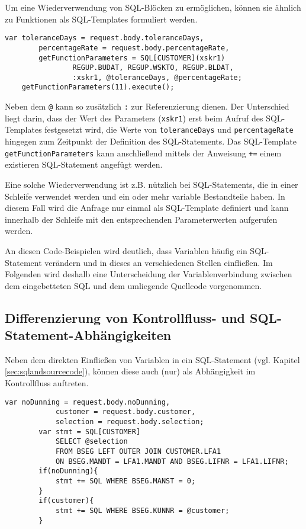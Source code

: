 Um eine Wiederverwendung von SQL-Blöcken zu ermöglichen, können sie ähnlich zu Funktionen als SQL-Templates \cite{Horschig2014} formuliert werden.

	\begin{lstlisting}[caption={SQL-Templates ermöglichen Wiederverwendung}, label={lst:sqlfunctions}, language=JavaScriptSQL]
	var toleranceDays = request.body.toleranceDays,
	    percentageRate = request.body.percentageRate,
	    getFunctionParameters = SQL[CUSTOMER](xskr1)
				REGUP.BUDAT, REGUP.WSKTO, REGUP.BLDAT,
				:xskr1, @toleranceDays, @percentageRate;
	getFunctionParameters(11).execute();
	\end{lstlisting}

Neben dem \texttt{@} kann so zusätzlich \texttt{:} zur Referenzierung dienen.
Der Unterschied liegt darin, dass der Wert des Parameters (\texttt{xskr1}) erst beim Aufruf des SQL-Templates festgesetzt wird, die Werte von \texttt{toleranceDays} und \texttt{percentageRate} hingegen zum Zeitpunkt der Definition des SQL-Statements.
Das SQL-Template \texttt{getFunctionParameters} kann anschließend mittels der Anweisung \texttt{+=} einem existieren SQL-Statement angefügt werden.

Eine solche Wiederverwendung ist z.B. nützlich bei SQL-Statements, die in einer Schleife verwendet werden und ein oder mehr variable Bestandteile haben.
In diesem Fall wird die Anfrage nur einmal als SQL-Template definiert und kann innerhalb der Schleife mit den entsprechenden Parameterwerten aufgerufen werden.

An diesen Code-Beispielen wird deutlich, dass Variablen häufig ein SQL-Statement verändern und in dieses an verschiedenen Stellen einfließen.
Im Folgenden wird deshalb eine Unterscheidung der Variablenverbindung zwischen dem eingebetteten SQL und dem umliegende Quellcode vorgenommen.

\subsection{Differenzierung von Kontrollfluss- und SQL-Statement-Abhängigkeiten}\label{sec:controlflowandsqldependencies}
Neben dem direkten Einfließen von Variablen in ein SQL-Statement (vgl. Kapitel \ref{sec:sqlandsourcecode}), können diese auch (nur) als Abhängigkeit im Kontrollfluss auftreten.

	\begin{lstlisting}[caption={Verschiedene Arten von Abhängigkeiten der Variablen}, label={lst:differentdep}, language=JavaScriptSQL]
		var noDunning = request.body.noDunning,
		    customer = request.body.customer,
		    selection = request.body.selection;
		var stmt = SQL[CUSTOMER]
			SELECT @selection
			FROM BSEG LEFT OUTER JOIN CUSTOMER.LFA1
			ON BSEG.MANDT = LFA1.MANDT AND BSEG.LIFNR = LFA1.LIFNR;
		if(noDunning){
			stmt += SQL WHERE BSEG.MANST = 0;
		}
		if(customer){
			stmt += SQL WHERE BSEG.KUNNR = @customer;
		}
	\end{lstlisting}

